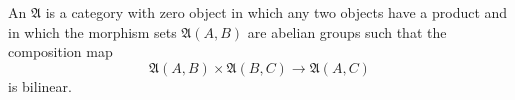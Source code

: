 An  $\mathfrak{A}$ is a category with zero object in which any two objects have a product and in which the morphism sets $\mathfrak{A}(A, B)$ are abelian groups such that the composition map
$$\mathfrak{A}(A, B) \times \mathfrak{A}(B, C) \to \mathfrak{A}(A, C)$$
is bilinear.
